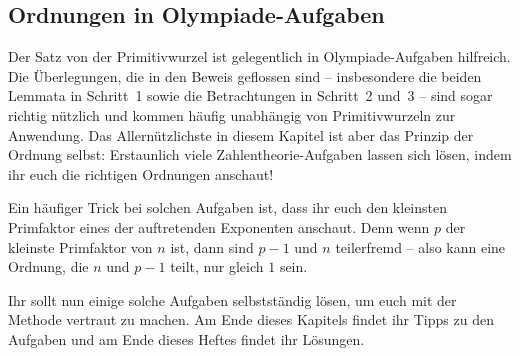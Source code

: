 \subsection*{Ordnungen in Olympiade-Aufgaben}

Der Satz von der Primitivwurzel ist gelegentlich in Olympiade-Aufgaben hilfreich. Die Überlegungen, die in den Beweis geflossen sind -- insbesondere die beiden Lemmata in Schritt~1 sowie die Betrachtungen in Schritt~2 und~3 -- sind sogar richtig nützlich und kommen häufig unabhängig von Primitivwurzeln zur Anwendung. Das Allernützlichste in diesem Kapitel ist aber das Prinzip der Ordnung selbst: Erstaunlich viele Zahlentheorie-Aufgaben lassen sich lösen, indem ihr euch die richtigen Ordnungen anschaut!

Ein häufiger Trick bei solchen Aufgaben ist, dass ihr euch den kleinsten Primfaktor eines der auftretenden Exponenten anschaut. Denn wenn $p$ der kleinste Primfaktor von $n$ ist, dann sind $p-1$ und $n$ teilerfremd -- also kann eine Ordnung, die $n$ und $p-1$ teilt, nur gleich $1$ sein.

Ihr sollt nun einige solche Aufgaben selbstständig lösen, um euch mit der Methode vertraut zu machen. Am Ende dieses Kapitels findet ihr Tipps zu den Aufgaben und am Ende dieses Heftes findet ihr Lösungen.

